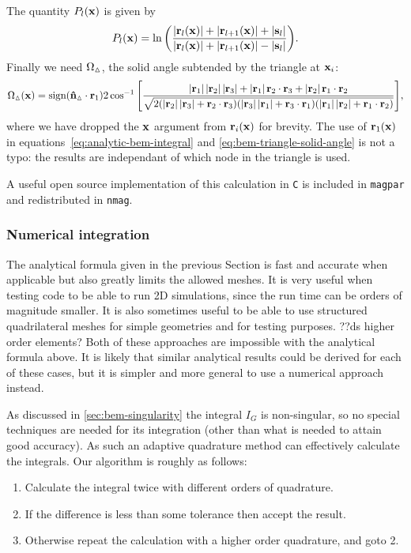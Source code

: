 The quantity $P_l(\mathbf{x})$ is given by
\begin{equation}
  P_l(\mathbf{x}) = \ln{\left( \frac{\left|{\mathbf{r}_l(\mathbf{x})} \right| + \left|{\mathbf{r}_{l+1}(\mathbf{x})} \right| + \left|{{\mathbf{s}}_l} \right|}
    {\left|{\mathbf{r}_l(\mathbf{x})} \right| + \left|{\mathbf{r}_{l+1}(\mathbf{x})} \right| - \left|{{\mathbf{s}}_l} \right|} \right)}.
\end{equation}
Finally we need $\Omega_\vartriangle$, the solid angle subtended by the triangle at $\mathbf{x}_i$:
\begin{equation}
  \label{eq:bem-triangle-solid-angle}
  \Omega_\vartriangle(\mathbf{x}) = \text{sign}(\mathbf{\hat{n}}_\vartriangle \cdot \mathbf{r}_1) 2 \cos^{-1}{\left[ \frac
    {\left|{\mathbf{r}_1} \right|\left|{\mathbf{r}_2} \right|\left|{\mathbf{r}_3} \right| + \left|{\mathbf{r}_1} \right| \mathbf{r}_2\cdot\mathbf{r}_3 + \left|{\mathbf{r}_2} \right|\mathbf{r}_1\cdot \mathbf{r}_2}
    {\sqrt{2(\left|{\mathbf{r}_2} \right|\left|{\mathbf{r}_3} \right| + \mathbf{r}_2\cdot\mathbf{r}_3)
        (\left|{\mathbf{r}_3} \right|\left|{\mathbf{r}_1} \right| + \mathbf{r}_3\cdot\mathbf{r}_1)
        (\left|{\mathbf{r}_1} \right|\left|{\mathbf{r}_2} \right| + \mathbf{r}_1\cdot\mathbf{r}_2)}} \right]},
\end{equation}
where we have dropped the $\mathbf{x}$ argument from $\mathbf{r}_i(\mathbf{x})$ for brevity.
The use of $\mathbf{r}_1(\mathbf{x})$ in equations~\eqref{eq:analytic-bem-integral} and \eqref{eq:bem-triangle-solid-angle} is not a typo: the results are independant of which node in the triangle is used.


A useful open source implementation of this calculation in \texttt{C} is included in \texttt{magpar}\cite{magpar-website} and redistributed in \texttt{nmag}\cite{nmag-website}.


\subsubsection{Numerical integration}

The analytical formula given in the previous Section is fast and accurate when applicable but also greatly limits the allowed meshes.
It is very useful when testing code to be able to run 2D simulations, since the run time can be orders of magnitude smaller.
It is also sometimes useful to be able to use structured quadrilateral meshes for simple geometries and for testing purposes.
??ds higher order elements?
Both of these approaches are impossible with the analytical formula above.
It is likely that similar analytical results could be derived for each of these cases, but it is simpler and more general to use a numerical approach instead.

As discussed in \autoref{sec:bem-singularity} the integral $I_G$ is non-singular, so no special techniques are needed for its integration (other than what is needed to attain good accuracy).
As such an adaptive quadrature method can effectively calculate the integrals.
Our algorithm is roughly as follows:
\begin{enumerate}
\item Calculate the integral twice with different orders of quadrature.
\item If the difference is less than some tolerance then accept the result.
\item Otherwise repeat the calculation with a higher order quadrature, and goto 2.
\end{enumerate}

